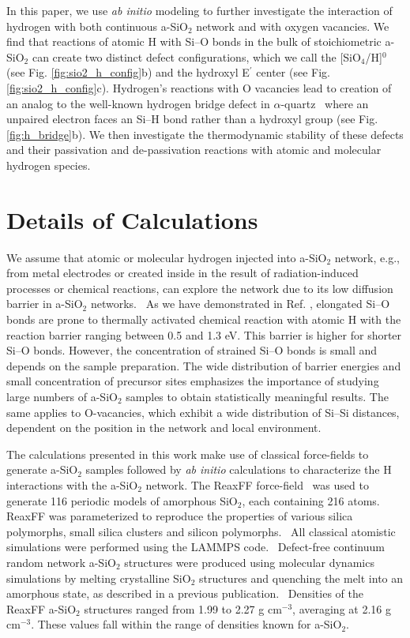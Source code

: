 \documentclass[aps,prb,reprint,superscriptaddress,showpacs]{revtex4-1}
\begin{document}
In this paper, we use \emph{ab initio} modeling to further investigate the interaction of hydrogen with both continuous a-SiO$_2$ network and with oxygen vacancies. We find that reactions of atomic H with \mbox{Si--O} bonds in the bulk of stoichiometric a-SiO$_2$ can create two distinct defect configurations, which we call the [SiO$_4$/H]$^0$ (see Fig. \ref{fig:sio2_h_config}b) and the hydroxyl E$^\prime$ center (see Fig. \ref{fig:sio2_h_config}c). Hydrogen's reactions with O vacancies lead to creation of an analog to the well-known hydrogen bridge defect in $\alpha$-quartz~\cite{blochl_vacancies,alkauskas_h} where an unpaired electron faces an \mbox{Si--H} bond rather than a hydroxyl group (see Fig. \ref{fig:h_bridge}b). We then investigate the thermodynamic stability of these defects and their passivation and de-passivation reactions with atomic and molecular hydrogen species. 

\section{Details of Calculations}
\label{sec:calc_details}

We assume that atomic or molecular hydrogen injected into a-SiO$_2$ network, e.g., from metal electrodes or created inside in the result of radiation-induced processes or chemical reactions, can explore the network due to its low diffusion barrier in a-SiO$_2$ networks.~\cite{kajihara_hydrogen,skuja_hdiffusion} As we have demonstrated in Ref. \cite{aelsayed_prl}, elongated \mbox{Si--O} bonds are prone to thermally activated chemical reaction with atomic H with the reaction barrier ranging between 0.5 and 1.3 eV. This barrier is higher for shorter \mbox{Si--O} bonds. However, the concentration of strained \mbox{Si--O} bonds is small and depends on the sample preparation. The wide distribution of barrier energies and small concentration of precursor sites emphasizes the importance of studying large numbers of a-SiO$_2$ samples to obtain statistically meaningful results. The same applies to O-vacancies, which exhibit a wide distribution of \mbox{Si--Si} distances, dependent on the position in the network and local environment.~\cite{asio2_3}

The calculations presented in this work make use of classical force-fields to generate a-SiO$_2$ samples followed by \emph{ab initio} calculations to characterize the H interactions with the a-SiO$_2$ network. The ReaxFF force-field~\cite{reaxff_sisio} was used to generate 116 periodic models of amorphous SiO$_{2}$, each containing 216 atoms. ReaxFF was parameterized to reproduce the properties of various silica polymorphs, small silica clusters and silicon polymorphs.~\cite{reaxff_h2o} All classical atomistic simulations were performed using the LAMMPS code.~\cite{lammps} Defect-free continuum random network a-SiO$_2$ structures were produced using molecular dynamics simulations by melting crystalline SiO$_2$ structures and quenching the melt into an amorphous state, as described in a previous publication.~\cite{aelsayed_prb} Densities of the ReaxFF a-SiO$_2$ structures ranged from 1.99 to 2.27 g cm$^{-3}$, averaging at 2.16 g cm$^{-3}$. These values fall within the range of densities known for a-SiO$_2$.  
\end{document}
